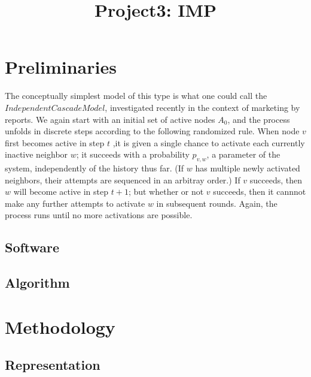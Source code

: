 \documentclass[conference,compsoc]{IEEEtran}
\begin{document}
\title{Project3: IMP}

\author{
}
\maketitle

\IEEEpeerreviewmaketitle


\section{Preliminaries}

The conceptually simplest model of this type is what one could call the
$Independent Cascade Model$, investigated recently in the context of
marketing by reports. We again start with an initial set of active nodes
$A_0$, and the process unfolds in discrete steps according to the
following randomized rule. When node $v$ first becomes active in step $t$
,it is given a single chance to activate each currently inactive
neighbor $w$; it succeeds with a probability $p_{v,w}$, a parameter of
the system, independently of the history thus far. (If $w$ has multiple
newly activated neighbors, their attempts are sequenced in an arbitray 
order.) If $v$ succeeds, then $w$ will become active in step $t+1$; but
whether or not $v$ succeeds, then it cannnot make any further attempts
to activate $w$ in subsequent rounds. Again, the process runs until no
more activations are possible.

\subsection{Software}


\subsection{Algorithm}
   


\section{Methodology}

\subsection{Representation}
\end{document}
